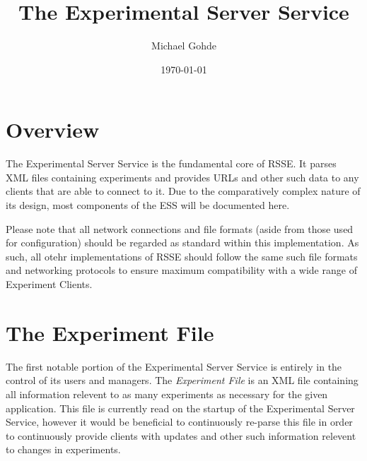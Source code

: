 \documentclass[letterpaper]{article}
\begin{document}
\title{The Experimental Server Service}
\author{Michael Gohde}
\date{\today}
\maketitle

\section{Overview}
The Experimental Server Service is the fundamental core of RSSE. It parses XML files containing experiments and provides URLs and other such data to any clients that are able to connect to it. Due to the comparatively complex nature of its design, most components of the ESS will be documented here. 

Please note that all network connections and file formats (aside from those used for configuration) should be regarded as standard within this implementation. As such, all otehr implementations of RSSE should follow the same such file formats and networking protocols to ensure maximum compatibility with a wide range of Experiment Clients.

\section{The Experiment File}
The first notable portion of the Experimental Server Service is entirely in the control of its users and managers. The \textit{Experiment File} is an XML file containing all information relevent to as many experiments as necessary for the given application. This file is currently read on the startup of the Experimental Server Service, however it would be beneficial to continuously re-parse this file in order to continuously provide clients with updates and other such information relevent to changes in experiments. 
\end{document}
